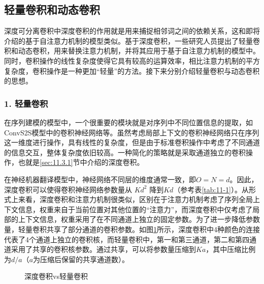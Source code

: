 
\subsection{轻量卷积和动态卷积}

\parinterval 深度可分离卷积中深度卷积的作用就是用来捕捉相邻词之间的依赖关系，这和{\chaptertwelve}即将介绍的基于自注意力机制的模型类似。基于深度卷积，一些研究人员提出了轻量卷积和动态卷积，用来替换注意力机制，并将其应用于基于自注意力机制的模型中。同时，卷积操作的线性复杂度使得它具有较高的运算效率，相比注意力机制的平方复杂度，卷积操作是一种更加“轻量”的方法。接下来分别介绍轻量卷积与动态卷积的思想。

\subsubsection{1. 轻量卷积}

\parinterval 在序列建模的模型中，一个很重要的模块就是对序列中不同位置信息的提取，如ConvS2S模型中的卷积神经网络等。虽然考虑局部上下文的卷积神经网络只在序列这一维度进行操作，具有线性的复杂度，但是由于标准卷积操作中考虑了不同通道的信息交互，整体复杂度依旧较高。一种简化的策略就是采取通道独立的卷积操作，也就是\ref{sec:11.3.1}节中介绍的深度卷积。

\parinterval 在神经机器翻译模型中，神经网络不同层的维度通常一致，即$O=N=d$。因此，深度卷积可以使得卷积神经网络参数量从 $Kd^2$ 降到$Kd$（参考表\ref{tab:11-1}）。从形式上来看，深度卷积和注意力机制很类似，区别在于注意力机制考虑了序列全局上下文信息，权重来自于当前位置对其他位置的“注意力”，而深度卷积中仅考虑了局部的上下文信息，权重采用了在不同通道上独立的固定参数。为了进一步降低参数量，轻量卷积共享了部分通道的卷积参数。如图\ref{fig:11-18}所示，深度卷积中4种颜色的连接代表了4个通道上独立的卷积核，而轻量卷积中，第一和第三通道，第二和第四通道采用了共享的卷积核参数。通过共享，可以将参数量压缩到$Ka$，其中压缩比例为$d/a$（$a$为压缩后保留的共享通道数）。

\begin{figure}[htp]
\centering

\caption{深度卷积vs轻量卷积}
\label{fig:11-18}
\end{figure}


